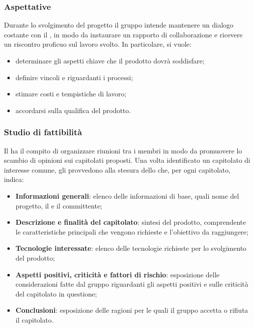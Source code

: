 \subsubsection{Aspettative}
Durante lo svolgimento del progetto il gruppo intende mantenere un dialogo costante con il , in modo da instaurare un rapporto di collaborazione e ricevere un riscontro proficuo sul lavoro svolto. In particolare, si vuole:
\begin{itemize}
	\item determinare gli aspetti chiave che il prodotto dovrà soddisfare;
	\item definire vincoli e  riguardanti i processi;
	\item stimare costi e tempistiche di lavoro;
	\item accordarsi sulla qualifica del prodotto.
\end{itemize}
\subsubsection{Studio di fattibilità}
Il \RdP{} ha il compito di organizzare riunioni tra i membri in modo da promuovere lo scambio di opinioni sui capitolati proposti. Una volta identificato un capitolato di interesse comune, gli \anas{} provvedono alla stesura dello \SdF{} che, per ogni capitolato, indica:
\begin{itemize}
	\item \textbf{Informazioni generali}: elenco delle informazioni di base, quali nome del progetto, il  e il committente;
	\item \textbf{Descrizione e finalità del capitolato}: sintesi del prodotto, comprendente le caratteristiche principali che vengono richieste e l'obiettivo da raggiungere;
	\item \textbf{Tecnologie interessate}: elenco delle tecnologie richieste per lo svolgimento del prodotto;
	\item \textbf{Aspetti positivi, criticità e fattori di rischio}: esposizione delle considerazioni fatte dal gruppo riguardanti gli aspetti positivi e sulle criticità del capitolato in questione;
	\item \textbf{Conclusioni}: esposizione delle ragioni per le quali il gruppo accetta o rifiuta il capitolato.
\end{itemize}
